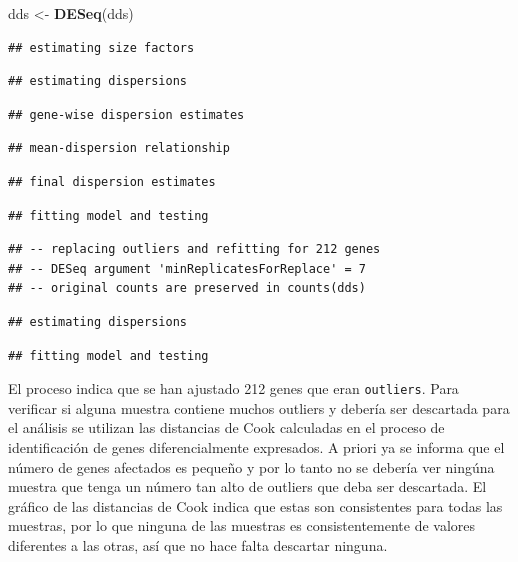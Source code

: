 \documentclass[
]{article}
\newenvironment{Shaded}{\begin{snugshade}}{\end{snugshade}}
\newcommand{\KeywordTok}[1]{\textcolor[rgb]{0.13,0.29,0.53}{\textbf{#1}}}
\newcommand{\NormalTok}[1]{#1}
\newcommand{\StringTok}[1]{\textcolor[rgb]{0.31,0.60,0.02}{#1}}
\begin{document}
\begin{Shaded}
\begin{Highlighting}[]
\NormalTok{dds <-}\StringTok{ }\KeywordTok{DESeq}\NormalTok{(dds)}
\end{Highlighting}
\end{Shaded}

\begin{verbatim}
## estimating size factors
\end{verbatim}

\begin{verbatim}
## estimating dispersions
\end{verbatim}

\begin{verbatim}
## gene-wise dispersion estimates
\end{verbatim}

\begin{verbatim}
## mean-dispersion relationship
\end{verbatim}

\begin{verbatim}
## final dispersion estimates
\end{verbatim}

\begin{verbatim}
## fitting model and testing
\end{verbatim}

\begin{verbatim}
## -- replacing outliers and refitting for 212 genes
## -- DESeq argument 'minReplicatesForReplace' = 7 
## -- original counts are preserved in counts(dds)
\end{verbatim}

\begin{verbatim}
## estimating dispersions
\end{verbatim}

\begin{verbatim}
## fitting model and testing
\end{verbatim}

El proceso indica que se han ajustado 212 genes que eran
\texttt{outliers}. Para verificar si alguna muestra contiene muchos
outliers y debería ser descartada para el análisis se utilizan las
distancias de Cook calculadas en el proceso de identificación de genes
diferencialmente expresados. A priori ya se informa que el número de
genes afectados es pequeño y por lo tanto no se debería ver ningúna
muestra que tenga un número tan alto de outliers que deba ser
descartada. El gráfico de las distancias de Cook indica que estas son
consistentes para todas las muestras, por lo que ninguna de las muestras
es consistentemente de valores diferentes a las otras, así que no hace
falta descartar ninguna.
\end{document}
